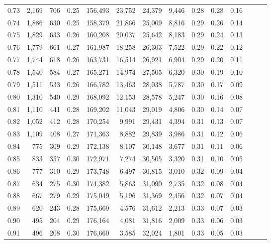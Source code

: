 \begin{tabular}{rrrrrrrrrrrrrr}
0.73 &  2,169 &  706 &  0.25 &  156,493 &   23,752 &  24,379 &   9,446 &  0.28 &  0.28 &      0.16 \\
0.74 &  1,886 &  630 &  0.25 &  158,379 &   21,866 &  25,009 &   8,816 &  0.29 &  0.26 &      0.14 \\
0.75 &  1,829 &  633 &  0.26 &  160,208 &   20,037 &  25,642 &   8,183 &  0.29 &  0.24 &      0.13 \\
0.76 &  1,779 &  661 &  0.27 &  161,987 &   18,258 &  26,303 &   7,522 &  0.29 &  0.22 &      0.12 \\
0.77 &  1,744 &  618 &  0.26 &  163,731 &   16,514 &  26,921 &   6,904 &  0.29 &  0.20 &      0.11 \\
0.78 &  1,540 &  584 &  0.27 &  165,271 &   14,974 &  27,505 &   6,320 &  0.30 &  0.19 &      0.10 \\
0.79 &  1,511 &  533 &  0.26 &  166,782 &   13,463 &  28,038 &   5,787 &  0.30 &  0.17 &      0.09 \\
0.80 &  1,310 &  540 &  0.29 &  168,092 &   12,153 &  28,578 &   5,247 &  0.30 &  0.16 &      0.08 \\
0.81 &  1,110 &  441 &  0.28 &  169,202 &   11,043 &  29,019 &   4,806 &  0.30 &  0.14 &      0.07 \\
0.82 &  1,052 &  412 &  0.28 &  170,254 &    9,991 &  29,431 &   4,394 &  0.31 &  0.13 &      0.07 \\
0.83 &  1,109 &  408 &  0.27 &  171,363 &    8,882 &  29,839 &   3,986 &  0.31 &  0.12 &      0.06 \\
0.84 &    775 &  309 &  0.29 &  172,138 &    8,107 &  30,148 &   3,677 &  0.31 &  0.11 &      0.06 \\
0.85 &    833 &  357 &  0.30 &  172,971 &    7,274 &  30,505 &   3,320 &  0.31 &  0.10 &      0.05 \\
0.86 &    777 &  310 &  0.29 &  173,748 &    6,497 &  30,815 &   3,010 &  0.32 &  0.09 &      0.04 \\
0.87 &    634 &  275 &  0.30 &  174,382 &    5,863 &  31,090 &   2,735 &  0.32 &  0.08 &      0.04 \\
0.88 &    667 &  279 &  0.29 &  175,049 &    5,196 &  31,369 &   2,456 &  0.32 &  0.07 &      0.04 \\
0.89 &    620 &  243 &  0.28 &  175,669 &    4,576 &  31,612 &   2,213 &  0.33 &  0.07 &      0.03 \\
0.90 &    495 &  204 &  0.29 &  176,164 &    4,081 &  31,816 &   2,009 &  0.33 &  0.06 &      0.03 \\
0.91 &    496 &  208 &  0.30 &  176,660 &    3,585 &  32,024 &   1,801 &  0.33 &  0.05 &      0.03 \\

\end{tabular}
